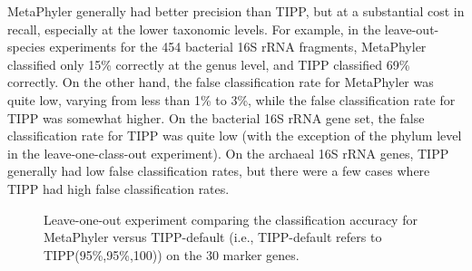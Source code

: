 MetaPhyler generally had better precision than
TIPP, but at a substantial cost in recall, especially
at the lower taxonomic levels.
For example, in the leave-out-species
experiments for the 454 bacterial 16S rRNA fragments, MetaPhyler
classified only 15\% correctly at the genus level, and TIPP
classified 69\% correctly.  On the other hand, the false
classification rate for MetaPhyler was quite low, varying from
less than 1\% to 3\%, while the false classification rate for
TIPP was somewhat higher.  On the bacterial 16S rRNA gene
set, the false classification rate for TIPP was quite low
(with the exception of the phylum level in the leave-one-class-out
experiment). On the archaeal 16S rRNA genes, 
TIPP generally had low false classification rates, but
there were a few cases
where TIPP had high false classification rates.

\begin{figure}[htpb]
\begin{center}
\hspace{-14pt}
\end{center}

\caption{\label{tipp:leave_out_30M} Leave-one-out experiment
          comparing the classification accuracy for MetaPhyler
          versus TIPP-default 
(i.e.,  TIPP-default refers to TIPP(95\%,95\%,100))
on the 30 marker genes.
}
\end{figure}

